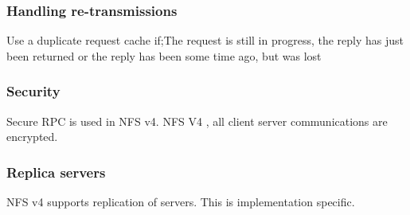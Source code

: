 \documentclass[twoside]{article}
\begin{document}
\subsubsection{Handling re-transmissions}
Use a duplicate request cache if;The request is still in progress, the reply has just been returned or the reply has been some time ago, but was lost 

\subsubsection{Security}
Secure RPC is used in NFS v4. NFS V4 , all client server communications are encrypted.
\subsubsection{Replica servers}
NFS v4 supports replication of servers. This is implementation specific. 
\end{document}
